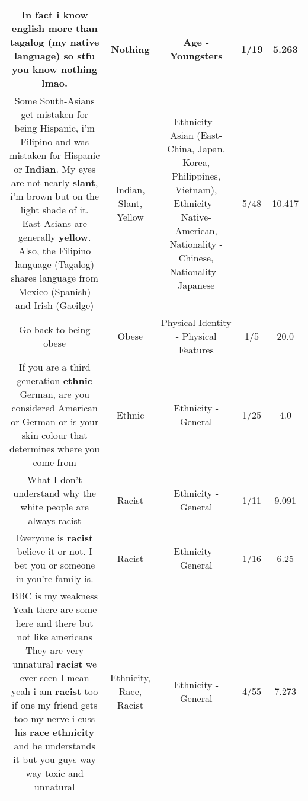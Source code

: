 \documentclass[11pt]{article}
\newlength\mylength
\begin{document}
\begin{center}
\begin{longtable}{|C{.65\mylength}|C{.30\mylength}|C{.12\mylength}|C{.12\mylength}|C{.12\mylength}|}
  \small {} In fact i know english more than tagalog (my native language) so stfu you know \textbf{nothing} lmao.\normalsize   & Nothing & Age - Youngsters & 1/19 & 5.263 \\  \hline
  \small Some South-Asians get mistaken for being Hispanic, i'm Filipino and was mistaken for Hispanic or \textbf{Indian}. My eyes are not nearly \textbf{slant}, i'm brown but on the light shade of it. East-Asians are generally \textbf{y\textbf{e\textbf{llow}}}. Also, the Filipino language (Tagalog) shares language from Mexico (Spanish) and Irish (Gaeilge)\normalsize   & Indian, Slant, Yellow & Ethnicity - Asian (East- China, Japan, Korea, Philippines, Vietnam), Ethnicity - Native-American, Nationality - Chinese, Nationality - Japanese & 5/48 & 10.417 \\  \hline
  \small Go back to being obese\normalsize   & Obese & Physical Identity - Physical Features & 1/5 & 20.0 \\  \hline
  \small If you are a third generation \textbf{ethnic} German, are you considered American or German or is your skin colour that determines where you come from\normalsize   & Ethnic & Ethnicity - General & 1/25 & 4.0 \\  \hline
  \small What I don't understand why the white people are always racist\normalsize   & Racist & Ethnicity - General & 1/11 & 9.091 \\  \hline
  \small Everyone is \textbf{racist} believe it or not. I bet you or someone in you're family is.\normalsize   & Racist & Ethnicity - General & 1/16 & 6.25 \\  \hline
  \small BBC is my weakness Yeah there are some here and there but not like americans They are very unnatural \textbf{racist} we ever seen I mean yeah i am \textbf{racist} too if one my friend gets too my nerve i cuss his \textbf{race} \textbf{ethnicity} and he understands it but you guys way way toxic and unnatural\normalsize   & Ethnicity, Race, Racist & Ethnicity - General & 4/55 & 7.273 \\  \hline

\end{longtable}
\end{center}
\end{document}
